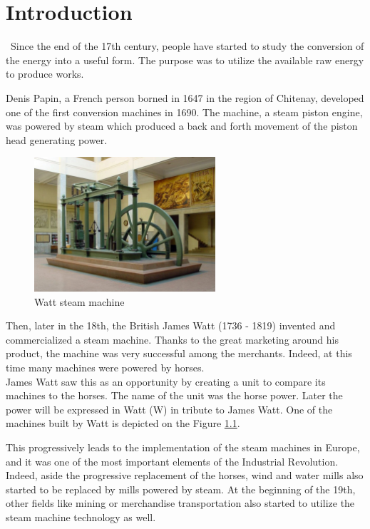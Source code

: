 \graphicspath{{Chapitre_2/Images/}}
\chapter{Introduction}\label{introduction}
\quad\, Since the end of the 17th century, people have started to study the conversion of the energy into a useful form. The purpose was to utilize the available raw energy to produce works.

Denis Papin, a French person borned in 1647 in the region of Chitenay, developed one of the first conversion machines in 1690. The machine, a steam piston engine, was powered by steam which produced a back and forth movement of the piston head generating power. 

\begin{figure}[h]
    \centering
    \includegraphics[width=0.6\textwidth]{Chapitre_1/Images/Maquina_vapor_Watt_ETSIIM.jpg}
    \caption{Watt steam machine\cite{Watt}}
    \label{fig:Watt}
\end{figure}

Then, later in the 18th, the British James Watt (1736 - 1819) invented and commercialized a steam machine. Thanks to the great marketing around his product, the machine was very successful among the merchants. Indeed, at this time many machines were powered by horses.\\

James Watt saw this as an opportunity by creating a unit to compare its machines to the horses. The name of the unit was the horse power. Later the power will be expressed in Watt (W) in tribute to James Watt. One of the machines built by Watt is depicted on the Figure \ref{fig:Watt}.

This progressively leads to the implementation of the steam machines in Europe, and it was one of the most important elements of the Industrial Revolution. Indeed, aside the progressive replacement of the horses, wind and water mills also started to be replaced by mills powered by steam. At the beginning of the 19th, other fields like mining or merchandise transportation also started to utilize the steam machine technology as well.

